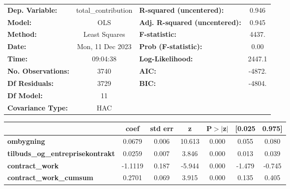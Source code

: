 \begin{center}
\begin{tabular}{lclc}
\toprule
\textbf{Dep. Variable:}                     & total\_contribution & \textbf{  R-squared (uncentered):}      &     0.946   \\
\textbf{Model:}                             &         OLS         & \textbf{  Adj. R-squared (uncentered):} &     0.945   \\
\textbf{Method:}                            &    Least Squares    & \textbf{  F-statistic:       }          &     4437.   \\
\textbf{Date:}                              &   Mon, 11 Dec 2023  & \textbf{  Prob (F-statistic):}          &     0.00    \\
\textbf{Time:}                              &       09:04:38      & \textbf{  Log-Likelihood:    }          &    2447.1   \\
\textbf{No. Observations:}                  &          3740       & \textbf{  AIC:               }          &    -4872.   \\
\textbf{Df Residuals:}                      &          3729       & \textbf{  BIC:               }          &    -4804.   \\
\textbf{Df Model:}                          &            11       & \textbf{                     }          &             \\
\textbf{Covariance Type:}                   &         HAC         & \textbf{                     }          &             \\
\bottomrule
\end{tabular}
\begin{tabular}{lcccccc}
                                            & \textbf{coef} & \textbf{std err} & \textbf{z} & \textbf{P$> |$z$|$} & \textbf{[0.025} & \textbf{0.975]}  \\
\midrule
\textbf{ombygning}                          &       0.0679  &        0.006     &    10.613  &         0.000        &        0.055    &        0.080     \\
\textbf{tilbuds\_og\_entreprisekontrakt}    &       0.0259  &        0.007     &     3.846  &         0.000        &        0.013    &        0.039     \\
\textbf{contract\_work}                     &      -1.1119  &        0.187     &    -5.944  &         0.000        &       -1.479    &       -0.745     \\
\textbf{contract\_work\_cumsum}             &       0.2701  &        0.069     &     3.915  &         0.000        &        0.135    &        0.405     \\

\end{tabular}
\end{center}
